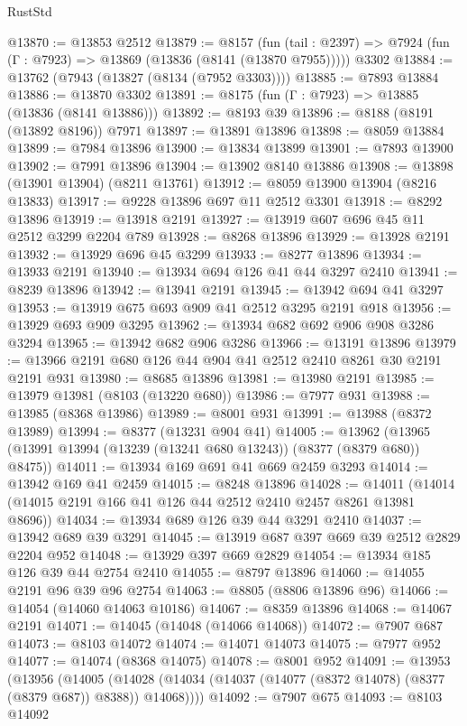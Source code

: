 \begin{lexlean}{RustStd}
\begin{coremodule}
{\begin{coremodule}
{{{{{{{{{{{{{{{{{{{{{{{{{{{{{{{{{{{{{{{{{{{{{{{{{{@13870 := @13853 @2512
@13879 := @8157
    (fun (tail : @2397) => @7924 (fun (Γ : @7923) => @13869 (@13836 (@8141 (@13870 @7955)))))
    @3302
@13884 := @13762 (@7943 (@13827 (@8134 (@7952 @3303))))
@13885 := @7893 @13884
@13886 := @13870 @3302
@13891 := @8175 (fun (Γ : @7923) => @13885 (@13836 (@8141 @13886)))
@13892 := @8193 @39
@13896 := @8188 (@8191 (@13892 @8196)) @7971
@13897 := @13891 @13896
@13898 := @8059 @13884
@13899 := @7984 @13896
@13900 := @13834 @13899
@13901 := @7893 @13900
@13902 := @7991 @13896
@13904 := @13902 @8140 @13886
@13908 := @13898 (@13901 @13904) (@8211 @13761)
@13912 := @8059 @13900 @13904 (@8216 @13833)
@13917 := @9228 @13896 @697 @11 @2512 @3301
@13918 := @8292 @13896
@13919 := @13918 @2191
@13927 := @13919 @607 @696 @45 @11 @2512 @3299 @2204 @789
@13928 := @8268 @13896
@13929 := @13928 @2191
@13932 := @13929 @696 @45 @3299
@13933 := @8277 @13896
@13934 := @13933 @2191
@13940 := @13934 @694 @126 @41 @44 @3297 @2410
@13941 := @8239 @13896
@13942 := @13941 @2191
@13945 := @13942 @694 @41 @3297
@13953 := @13919 @675 @693 @909 @41 @2512 @3295 @2191 @918
@13956 := @13929 @693 @909 @3295
@13962 := @13934 @682 @692 @906 @908 @3286 @3294
@13965 := @13942 @682 @906 @3286
@13966 := @13191 @13896
@13979 := @13966 @2191 @680 @126 @44 @904 @41 @2512 @2410 @8261 @30 @2191 @2191 @931
@13980 := @8685 @13896
@13981 := @13980 @2191
@13985 := @13979 @13981 (@8103 (@13220 @680))
@13986 := @7977 @931
@13988 := @13985 (@8368 @13986)
@13989 := @8001 @931
@13991 := @13988 (@8372 @13989)
@13994 := @8377 (@13231 @904 @41)
@14005 := @13962 (@13965 (@13991 @13994 (@13239 (@13241 @680 @13243)) (@8377 (@8379 @680)) @8475))
@14011 := @13934 @169 @691 @41 @669 @2459 @3293
@14014 := @13942 @169 @41 @2459
@14015 := @8248 @13896
@14028 := @14011 (@14014 (@14015 @2191 @166 @41 @126 @44 @2512 @2410 @2457 @8261 @13981 @8696))
@14034 := @13934 @689 @126 @39 @44 @3291 @2410
@14037 := @13942 @689 @39 @3291
@14045 := @13919 @687 @397 @669 @39 @2512 @2829 @2204 @952
@14048 := @13929 @397 @669 @2829
@14054 := @13934 @185 @126 @39 @44 @2754 @2410
@14055 := @8797 @13896
@14060 := @14055 @2191 @96 @39 @96 @2754
@14063 := @8805 (@8806 @13896 @96)
@14066 := @14054 (@14060 @14063 @10186)
@14067 := @8359 @13896
@14068 := @14067 @2191
@14071 := @14045 (@14048 (@14066 @14068))
@14072 := @7907 @687
@14073 := @8103 @14072
@14074 := @14071 @14073
@14075 := @7977 @952
@14077 := @14074 (@8368 @14075)
@14078 := @8001 @952
@14091 := @13953
    (@13956
      (@14005 (@14028 (@14034 (@14037 (@14077 (@8372 @14078) (@8377 (@8379 @687)) @8388)) @14068))))
@14092 := @7907 @675
@14093 := @8103 @14092
}}}}}}}}}}}}}}}}}}}}}}}}}}}}}}}}}}}}}}}}}}}}}}}}}}
\end{coremodule}}
\end{coremodule}
\end{lexlean}
